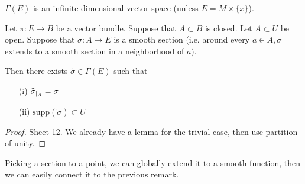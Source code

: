 \begin{remark}
    \(\Gamma(E)\) is an infinite dimensional vector space (unless \(E=M\times \{x\}\)).
\end{remark}

\begin{lemma}\label{lem:8.6}
    Let \(\pi:E\to B\) be a vector bundle. Suppose that \(A\subset B\) is closed. Let \(A\subset U\) be open.
    Suppose that \(\sigma:A\to E\) is a smooth section (i.e. around every \(a\in A,\sigma\) extends to a smooth section in a neighborhood of \(a\)).
    
    Then there exists \(\tilde{\sigma}\in \Gamma(E)\) such that 
    \begin{enumerate}
        \item[(i)] \(\tilde{\sigma}_{|_{A}}=\sigma\)
        \item[(ii)] \(\text{supp}(\tilde{\sigma})\subset U\)  
    \end{enumerate}
\end{lemma}

\begin{proof}
    Sheet 12. We already have a lemma for the trivial case, then use partition of unity.
\end{proof}

Picking a section to a point, we can globally extend it to a smooth function, then we can easily connect it 
to the previous remark.



